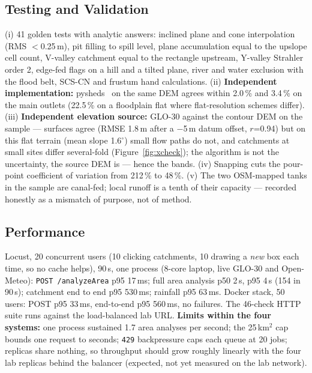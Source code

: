 \documentclass[manuscript,screen,review]{acmart}
\begin{document}
\subsection{Testing and Validation}\label{sec:testing}
(i) 41 golden tests with analytic answers: inclined plane and cone
interpolation (RMS $<$0.25\,m), pit filling to spill level, plane accumulation equal to the
upslope cell count, V-valley catchment equal to the rectangle upstream, Y-valley Strahler
order 2, edge-fed flags on a hill and a tilted plane, river and water exclusion with the flood
belt, SCS-CN and frustum hand calculations. (ii) \textbf{Independent implementation:}
pysheds~\cite{pysheds} on the same DEM agrees within 2.0\,\% and 3.4\,\% on the main outlets
(22.5\,\% on a floodplain flat where flat-resolution schemes differ). (iii) \textbf{Independent
elevation source:} GLO-30 against the contour DEM on the sample --- surfaces agree (RMSE
1.8\,m after a $-$5\,m datum offset, $r$=0.94) but on this flat terrain (mean slope
1.6$^\circ$) small flow paths do not, and catchments at small sites differ several-fold
(Figure~\ref{fig:xcheck}); the algorithm is not the uncertainty, the source DEM is --- hence
the bands. (iv) Snapping cuts the pour-point coefficient of variation from 212\,\% to 48\,\%.
(v) The two OSM-mapped tanks in the sample are canal-fed; local runoff is a tenth of their
capacity --- recorded honestly as a mismatch of purpose, not of method.

\subsection{Performance}
Locust, 20 concurrent users (10 clicking catchments, 10 drawing a \emph{new} box each time, so
no cache helps), 90\,s, one process (8-core laptop, live GLO-30 and Open-Meteo): \texttt{POST
/analyzeArea} p95 17\,ms; full area analysis p50 2\,s, p95 4\,s (154 in 90\,s); catchment end
to end p95 530\,ms; rainfall p95 63\,ms. Docker stack, 50 users: POST p95 33\,ms, end-to-end
p95 560\,ms, no failures. The 46-check HTTP suite runs against the load-balanced lab URL.
\textbf{Limits within the four systems:} one process sustained 1.7 area analyses per second;
the 25\,km$^2$ cap bounds one request to seconds; \texttt{429} backpressure caps each queue at
20 jobs; replicas share nothing, so throughput should grow roughly linearly with the four
lab replicas behind the balancer (expected, not yet measured on the lab network).

\end{document}
